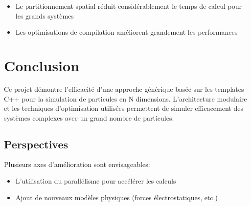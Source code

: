 \documentclass[12pt,a4paper]{article}
\begin{document}
\begin{itemize}
    \item Le partitionnement spatial réduit considérablement le temps de calcul pour les grands systèmes
    \item Les optimisations de compilation améliorent grandement les performances
\end{itemize}

\section{Conclusion}

Ce projet démontre l'efficacité d'une approche générique basée sur les templates C++ pour la simulation de particules en N dimensions. L'architecture modulaire et les techniques d'optimisation utilisées permettent de simuler efficacement des systèmes complexes avec un grand nombre de particules.

\subsection{Perspectives}

Plusieurs axes d'amélioration sont envisageables:

\begin{itemize}
    \item L'utilisation du parallélisme pour accélérer les calculs
    \item Ajout de nouveaux modèles physiques (forces électrostatiques, etc.)
\end{itemize}
\end{document}
